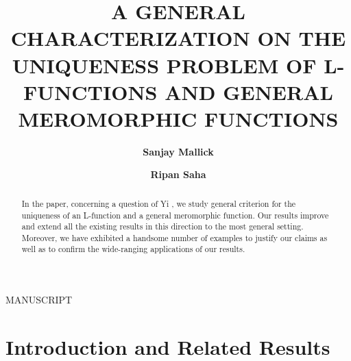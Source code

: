 \documentclass[a4paper,draft]{amsproc}
\title[A GENERAL CHARACTERIZATION ON THE UNIQUENESS PROBLEM...]{A GENERAL CHARACTERIZATION ON THE UNIQUENESS PROBLEM OF L-FUNCTIONS AND GENERAL MEROMORPHIC FUNCTIONS}
\author[Mallick]{\bfseries Sanjay Mallick}
\author[Saha]{\bfseries Ripan Saha}
\theoremstyle{plain}
\theoremstyle{definition}
\theoremstyle{remark}
\numberwithin{equation}{section}
\begin{document}
	
	{\begin{flushleft}\baselineskip9pt\scriptsize
			MANUSCRIPT
	\end{flushleft}}
	\vspace{18mm} \setcounter{page}{1} \thispagestyle{empty}
	
	
	\begin{abstract}
		 In the paper, concerning a question of Yi \cite{yuan2018}, we study general criterion for the uniqueness of an L-function and a general meromorphic function. Our results improve and extend all the existing results in this direction \cite{yuan2018,ss,sh,bk} to the most general setting. Moreover, we have exhibited a handsome number of examples to justify our claims as well as to confirm the wide-ranging applications of our results.  
	\end{abstract}
	
	\maketitle
	
	\section{Introduction and Related Results} 
	
\end{document}
